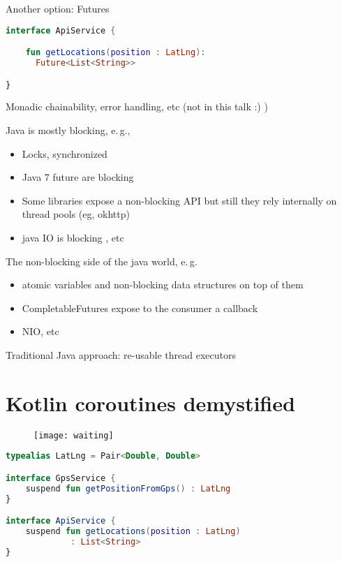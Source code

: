 \documentclass[10pt]{beamer}
\providecommand{\eg}{e.\,g.}
\begin{document}
\begin{frame}[fragile]
	Another option: Futures 
\begin{lstlisting}[language=Kotlin, basicstyle=\ttfamily]
interface ApiService {

    fun getLocations(position : LatLng): 
      Future<List<String>>

}
\end{lstlisting}
	Monadic chainability, error handling, etc (not in this talk :) ) 
\end{frame}

\begin{frame}
	Java is mostly blocking, \eg, 
	\begin{itemize}
		\item Locks, synchronized
		\item Java 7 future are blocking 
		\item Some libraries expose a non-blocking API but still they rely internally on thread pools (eg, okhttp) 
		\item java IO is blocking , etc
	\end{itemize}

	The non-blocking  side of the java world, \eg 
	\begin{itemize}
		\item atomic variables and non-blocking data structures on top of them
		\item CompletableFutures expose to the consumer a callback 
		\item NIO, etc
	\end{itemize}
	 
	 Traditional Java approach: re-usable thread executors 
\end{frame}


\section{Kotlin coroutines demystified }
\begin{frame}
	\begin{figure}
		\centering
		\texttt{[image: waiting]}
	\end{figure}
\end{frame}
\begin{frame}[fragile]
\begin{lstlisting}[language=Kotlin, basicstyle=\ttfamily]
typealias LatLng = Pair<Double, Double>

interface GpsService { 
    suspend fun getPositionFromGps() : LatLng
}

interface ApiService { 
    suspend fun getLocations(position : LatLng) 
             : List<String>
}
\end{lstlisting}
\end{frame}
\end{document}

